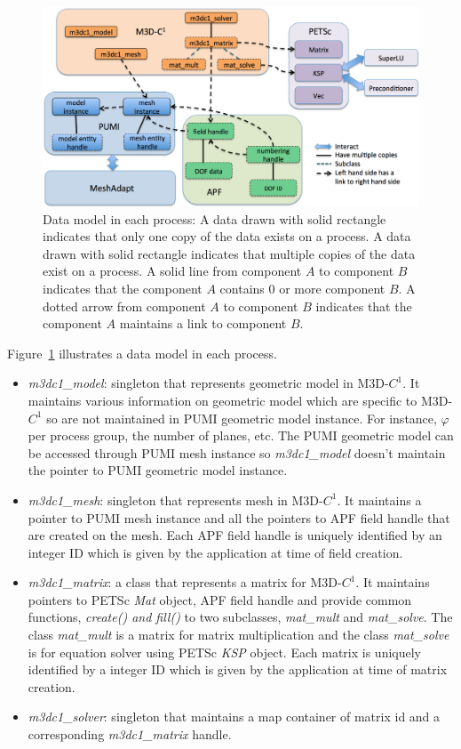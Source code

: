 \documentclass[11pt]{article}  %
\begin{document}
\begin{figure}[hbt]
\center
\includegraphics[width=6in]{fig/m3dc1-sw.png}
\caption{\small{Data model in each process: A data drawn with solid rectangle indicates that only one copy of the data exists on a process. A data drawn with solid rectangle indicates that multiple copies of the data exist on a process. A solid line from component $A$ to component $B$ indicates that the component $A$ contains 0 or more component $B$. A dotted arrow from component $A$ to component $B$ indicates that the component $A$ maintains a link to component $B$.}}
\label{fig:m3dc1-datamodel}
\end{figure}

Figure~\ref{fig:m3dc1-datamodel} illustrates a data model in each process. 
\begin{itemize}
\item \emph{m3dc1\_model}: singleton that represents geometric model in M3D-$C^1$. It maintains various information on geometric model which are specific to M3D-$C^1$ so are not maintained in PUMI geometric model instance. For instance, $\varphi$ per process group, the number of planes, etc. The PUMI geometric model can be accessed through PUMI mesh instance so \emph{m3dc1\_model} doesn't maintain the pointer to PUMI geometric model instance.
\item \emph{m3dc1\_mesh}: singleton that represents mesh in M3D-$C^1$. It maintains a pointer to PUMI mesh instance and all the pointers to APF field handle that are created on the mesh. Each APF field handle is uniquely identified by an integer ID which is given by the application at time of field creation.
\item \emph{m3dc1\_matrix}: a class that represents a matrix for M3D-$C^1$. It maintains pointers to PETSc \emph{Mat} object, APF field handle and provide common functions, \emph{create() and fill()} to two subclasses, \emph{mat\_mult} and \emph{mat\_solve}.  The class \emph{mat\_mult} is a matrix for matrix multiplication and the class \emph{mat\_solve} is for equation solver using PETSc \emph{KSP} object. Each matrix is uniquely identified by a integer ID which is given by the application at time of matrix creation.
\item \emph{m3dc1\_solver}: singleton that maintains a map container of matrix id and a corresponding \emph{m3dc1\_matrix} handle. 
\end{itemize}
\end{document}
